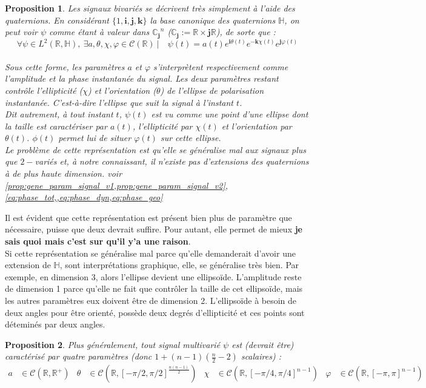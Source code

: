 \documentclass[hidelinks, french, oneside]{article}
\newcommand{\R}{\mathbb{R}}
\newcommand{\C}{\mathbb{C}}
\renewcommand{\bf}[1]{\boldsymbol{#1}}
\theoremstyle{enonce}
\newtheorem{proposition}{Proposition}
\theoremstyle{special}
\theoremstyle{rqlike}
\theoremstyle{exo}
\theoremstyle{demo}
\begin{document}
\begin{proposition}\label{prop:quatern}
Les signaux bivariés se décrivent très simplement à l'aide des quaternions. En considérant $\{1, \bf{i},\bf{j},\bf{k}\}$ la base canonique des quaternions $\mathbb{H}$, on peut voir $\psi$ comme étant à valeur dans ${\C_{\bf{j}}}^n$ ($\C_{\bf{j}} :=\R\times \bf{j}\R$), de sorte que :
\[\forall \psi\in L^2(\R,\mathbb{H}),\ \exists a,\theta,\chi,\varphi \in\mathcal{C}(\R)\ |\quad \psi(t) = a(t)e^{\bf{i}\theta(t)}e^{-\bf{k}\chi(t)}e^{\bf{j}\varphi(t)}\]
\\
Sous cette forme, les paramètres $a$ et $\varphi$ s'interprètent respectivement comme l'amplitude et la phase instantanée du signal. Les deux paramètres restant contrôle l'ellipticité ($\chi$) et l'orientation ($\theta$) de l’ellipse de polarisation instantanée. C'est-à-dire l'ellipse que suit la signal à l'instant $t$.
\\
Dit autrement, à tout instant $t$, $\psi(t)$ est vu comme une point d'une ellipse dont la taille est caractériser par $a(t)$, l'ellipticité par $\chi(t)$ et l'orientation par $\theta(t)$. $\phi(t)$ permet lui de situer $\varphi(t)$ sur cette ellipse.
\\

\textit{Le problème de cette représentation est qu'elle se généralise mal aux signaux plus que $2-$variés et, à notre connaissant, il n'existe pas d'extensions des quaternions à de plus haute dimension. voir \cref{prop:gene_param_signal_v1,prop:gene_param_signal_v2}, \cref{eq:phase_tot,,eq:phase_dyn,eq:phase_geo}} 
\end{proposition}

Il est évident que cette représentation est présent bien plus de paramètre que nécessaire, puisse que deux devrait suffire. Pour autant, elle permet de mieux \textbf{je sais quoi mais c'est sur qu'il y'a une raison}.
\\
Si cette représentation se généralise mal parce qu'elle demanderait d'avoir une extension de $\mathbb{H}$, sont interprétations graphique, elle, se généralise très bien. Par exemple, en dimension 3, alors l'ellipse devient une ellipsoïde. L'amplitude reste de dimension 1 parce qu'elle ne fait que contrôler la taille de cet ellipsoïde, mais les autres paramètres eux doivent être de dimension 2. L'ellipsoïde à besoin de deux angles pour être orienté, possède deux degrés d'ellipticité et ces points sont déteminés par deux angles.
\\

\begin{proposition}\label{prop:gene_param_signal_v1}
Plus généralement, tout signal multivarié $\psi$ est (\textit{devrait être}) caractérisé par quatre paramètres (donc $1+(n-1)(\frac{n}{2}-2)$ scalaires) :
\begin{align*}
	a&\in\mathcal{C}(\R,\R^+)  &  \theta&\in\mathcal{C}(\R, [-\pi/2,\pi/2]^{\frac{n(n-1)}{2}})  &  \chi&\in\mathcal{C}(\R, [-\pi/4,\pi/4]^{n-1})  &  \varphi&\in\mathcal{C}(\R, [-\pi,\pi]^{n-1})
\end{align*}	
\end{proposition}
\end{document}
